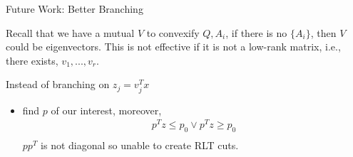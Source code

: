 \documentclass[aspectratio=1610, 9pt]{beamer}
\begin{document}
\begin{frame}[allowframebreaks]{Future Work: Better Branching}

  Recall that we have a mutual \(V\) to convexify \({Q, A_i}\), if there is no \(\{A_i\}\), then \(V\) could be eigenvectors. This is not effective if it is not a low-rank matrix, i.e., there exists, \(v_1, ..., v_r\).

  Instead of branching on \(z_j = v_j^T x\)

  \begin{itemize}
    \item find \(p\) of our interest, moreover,
          \begin{align*}
            p^Tz \le p_0 \vee  p^Tz \ge p_0 \\
          \end{align*}
          \(pp^T\) is not diagonal so unable to create RLT cuts.
  \end{itemize}

\end{frame}
\end{document}
